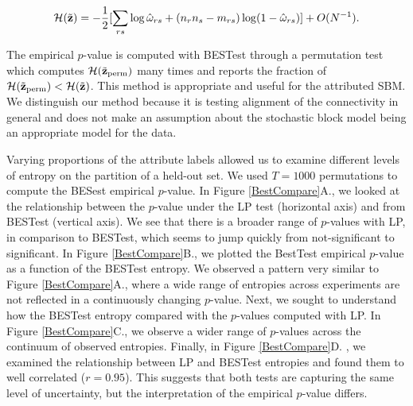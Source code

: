 \begin{equation}
\mathcal{H}({\tilde{\bf z}})=-\frac{1}{2}[\sum_{rs}\log \hat{\omega}_{rs}+(n_{r}n_{s}-m_{rs})\log(1-\hat{\omega}_{rs})]+O(N^{-1}). 
\end{equation}

The empirical $p$-value is computed with BESTest through a permutation test which computes $\mathcal{H}({\tilde{\bf z}}_{\text{perm}})$ many times and reports the fraction of $\mathcal{H}({\tilde{\bf z}}_{\text{perm}})<\mathcal{H}({\tilde{\bf z}})$. This method is appropriate and useful for the attributed SBM. We distinguish our method because it is testing alignment of the connectivity in general and does not make an assumption about the stochastic block model being an appropriate model for the data. 

Varying proportions of the attribute labels allowed us to examine different levels of entropy on the partition of a held-out set. We used $T=1000$ permutations to compute the BESest empirical $p$-value. In Figure \ref{BestCompare}A., we looked at the relationship between the $p$-value under the LP test (horizontal axis) and from BESTest (vertical axis). We see that there is a broader range of $p$-values with LP, in comparison to BESTest, which seems to jump quickly from not-significant to significant. In Figure \ref{BestCompare}B., we plotted the BestTest empirical $p$-value as a function of the BESTest entropy. We observed a pattern very similar to Figure \ref{BestCompare}A., where a wide range of entropies across experiments are not reflected in a continuously changing $p$-value. Next, we sought to understand how the BESTest entropy compared with the $p$-values computed with LP. In Figure \ref{BestCompare}C., we observe a wider range of $p$-values across the continuum of observed entropies. Finally, in Figure \ref{BestCompare}D. , we examined the relationship between LP and BESTest entropies and found them to well correlated ($r=0.95$). This suggests that both tests are capturing the same level of uncertainty, but the interpretation of the empirical $p$-value differs. 


